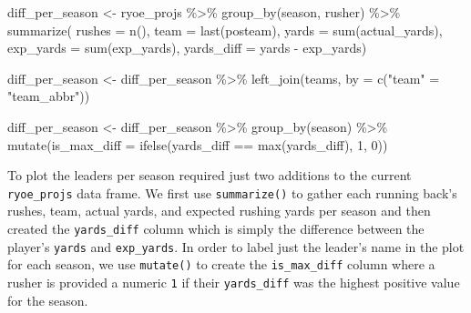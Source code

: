 \documentclass[
  letterpaper,
]{krantz}
\newenvironment{Shaded}{\begin{snugshade}}{\end{snugshade}}
\newcommand{\AttributeTok}[1]{\textcolor[rgb]{0.40,0.45,0.13}{#1}}
\newcommand{\DecValTok}[1]{\textcolor[rgb]{0.68,0.00,0.00}{#1}}
\newcommand{\FunctionTok}[1]{\textcolor[rgb]{0.28,0.35,0.67}{#1}}
\newcommand{\NormalTok}[1]{\textcolor[rgb]{0.00,0.23,0.31}{#1}}
\newcommand{\OtherTok}[1]{\textcolor[rgb]{0.00,0.23,0.31}{#1}}
\newcommand{\SpecialCharTok}[1]{\textcolor[rgb]{0.37,0.37,0.37}{#1}}
\newcommand{\StringTok}[1]{\textcolor[rgb]{0.13,0.47,0.30}{#1}}
\begin{document}
\begin{Shaded}
\begin{Highlighting}[]
\NormalTok{diff\_per\_season }\OtherTok{\textless{}{-}}\NormalTok{ ryoe\_projs }\SpecialCharTok{\%\textgreater{}\%}
  \FunctionTok{group\_by}\NormalTok{(season, rusher) }\SpecialCharTok{\%\textgreater{}\%}
  \FunctionTok{summarize}\NormalTok{(}
    \AttributeTok{rushes =} \FunctionTok{n}\NormalTok{(),}
    \AttributeTok{team =} \FunctionTok{last}\NormalTok{(posteam),}
    \AttributeTok{yards =} \FunctionTok{sum}\NormalTok{(actual\_yards),}
    \AttributeTok{exp\_yards =} \FunctionTok{sum}\NormalTok{(exp\_yards),}
    \AttributeTok{yards\_diff =}\NormalTok{ yards }\SpecialCharTok{{-}}\NormalTok{ exp\_yards)}

\NormalTok{diff\_per\_season }\OtherTok{\textless{}{-}}\NormalTok{ diff\_per\_season }\SpecialCharTok{\%\textgreater{}\%}
  \FunctionTok{left\_join}\NormalTok{(teams, }\AttributeTok{by =} \FunctionTok{c}\NormalTok{(}\StringTok{"team"} \OtherTok{=} \StringTok{"team\_abbr"}\NormalTok{))}

\NormalTok{diff\_per\_season }\OtherTok{\textless{}{-}}\NormalTok{ diff\_per\_season }\SpecialCharTok{\%\textgreater{}\%}
  \FunctionTok{group\_by}\NormalTok{(season) }\SpecialCharTok{\%\textgreater{}\%}
  \FunctionTok{mutate}\NormalTok{(}\AttributeTok{is\_max\_diff =} \FunctionTok{ifelse}\NormalTok{(yards\_diff }\SpecialCharTok{==} \FunctionTok{max}\NormalTok{(yards\_diff), }\DecValTok{1}\NormalTok{, }\DecValTok{0}\NormalTok{))}
\end{Highlighting}
\end{Shaded}

To plot the leaders per season required just two additions to the
current \texttt{ryoe\_projs} data frame. We first use
\texttt{summarize()} to gather each running back's rushes, team, actual
yards, and expected rushing yards per season and then created the
\texttt{yards\_diff} column which is simply the difference between the
player's \texttt{yards} and \texttt{exp\_yards}. In order to label just
the leader's name in the plot for each season, we use \texttt{mutate()}
to create the \texttt{is\_max\_diff} column where a rusher is provided a
numeric \texttt{1} if their \texttt{yards\_diff} was the highest
positive value for the season.
\end{document}
